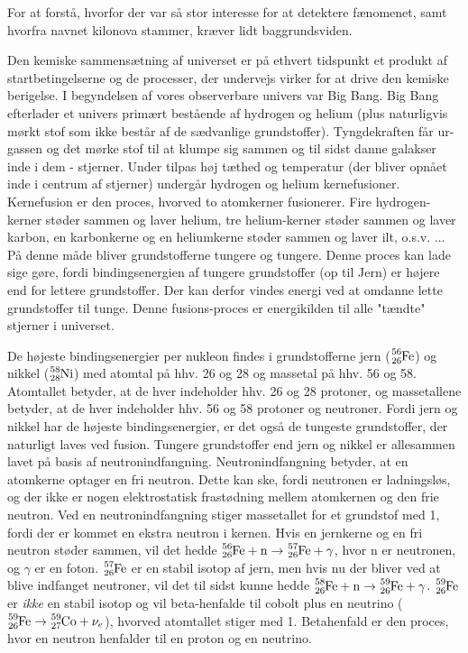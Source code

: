 \documentclass[twocolumn]{article}
\begin{document}
For at forstå, hvorfor der var så stor interesse for at detektere fænomenet, samt hvorfra navnet kilonova stammer, kræver lidt baggrundsviden.

Den kemiske sammensætning af universet er på ethvert tidspunkt et produkt af startbetingelserne og de processer, der undervejs virker for at drive den kemiske berigelse. I begyndelsen af vores observerbare univers var Big Bang. Big Bang efterlader et univers primært bestående af hydrogen og helium (plus naturligvis mørkt stof som ikke består af de sædvanlige grundstoffer). Tyngdekraften får ur-gassen og det mørke stof til at klumpe sig sammen og til sidst danne galakser inde i dem - stjerner. Under tilpas høj tæthed og temperatur (der bliver opnået inde i centrum af  stjerner) undergår hydrogen og helium kernefusioner. Kernefusion er den proces, hvorved to atomkerner fusionerer. Fire hydrogen-kerner støder sammen og laver helium, tre helium-kerner støder sammen og laver karbon, en karbonkerne og en heliumkerne støder sammen og laver ilt, o.s.v. ... På denne måde bliver grundstofferne tungere og tungere. Denne proces kan lade sige gøre, fordi bindingsenergien af tungere grundstoffer (op til Jern) er højere end for lettere grundstoffer. Der kan derfor vindes energi ved at omdanne lette grundstoffer til tunge. Denne fusions-proces er energikilden til alle "tændte" stjerner i universet.


De højeste bindingsenergier per nukleon findes i grundstofferne jern ($\ce{_{26}^{56}Fe}$) og nikkel ($\ce{_{28}^{58}Ni}$) med atomtal på hhv. 26 og 28 og massetal på hhv. 56 og 58. Atomtallet betyder, at de hver indeholder hhv. 26 og 28 protoner, og massetallene betyder, at de hver indeholder hhv. 56 og 58 protoner og neutroner. Fordi jern og nikkel har de højeste bindingsenergier, er det også de tungeste grundstoffer, der naturligt laves ved fusion. Tungere grundstoffer end jern og nikkel er allesammen lavet på basis af neutronindfangning. Neutronindfangning betyder, at en atomkerne optager en fri neutron. Dette kan ske, fordi neutronen er ladningsløs, og der ikke er nogen elektrostatisk frastødning mellem atomkernen og den frie neutron. Ved en neutronindfangning stiger massetallet for et grundstof med 1, fordi der er kommet en ekstra neutron i kernen. Hvis en jernkerne og en fri neutron støder sammen, vil det hedde $\ce{_{26}^{56}Fe} + \mathrm{n} \rightarrow \ce{_{26}^{57}Fe} + \gamma$, hvor n er neutronen, og $\gamma$ er en foton. $\ce{_{26}^{57}Fe}$ er en stabil isotop af jern, men hvis nu der bliver ved at blive indfanget neutroner, vil det til sidst kunne hedde $\ce{_{26}^{58}Fe} + \mathrm{n} \rightarrow \ce{_{26}^{59}Fe} + \gamma$. $\ce{_{26}^{59}Fe}$ er \textit{ikke} en stabil isotop og vil beta-henfalde til cobolt plus en neutrino ( $\ce{_{26}^{59}Fe} \rightarrow  \ce{_{27}^{59}Co} + \nu_e$), hvorved atomtallet stiger med 1. Betahenfald er den proces, hvor en neutron henfalder til en proton og en neutrino.
\end{document}
